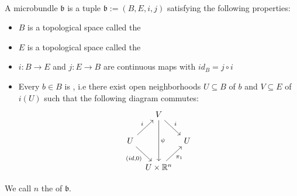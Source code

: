 \\ A microbundle $\mathfrak{b}$ is a tuple $\mathfrak{b} := (B, E, i, j)$ satisfying the following properties:
\begin{itemize}
    \item $B$ is a topological space called the 
    \item $E$ is a topological space called the 
    \item $i: B \to E$ and $j: E \to B$ are continuous maps with $id_B = j \circ i$
    \item Every $b \in B$ is , i.e there exist open neighborhoods $U \subseteq B$ of $b$ and $V \subseteq E$ of $i(U)$ such that the following diagram commutes:
    \[\begin{tikzcd}[column sep=tiny]
        & V \ar[dr, "i"] \ar[dd, "\psi"] & \\
        U \ar[ur, "i"] \ar[dr, "{(id, 0)}"'] & & U \\
        & U \times\R^n \ar[ur, "\pi_1"'] &
    \end{tikzcd}\]
\end{itemize}
We call $n$ the  of $\mathfrak{b}$.